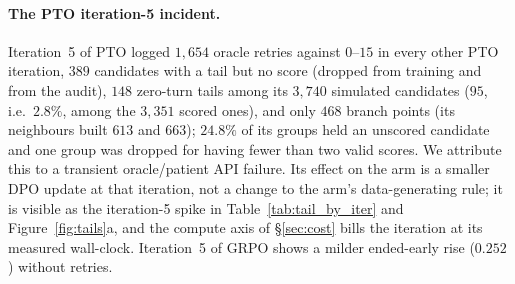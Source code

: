 \paragraph{The PTO \Kf{} iteration-5 incident.} Iteration~5 of PTO \Kf{} logged $1{,}654$
oracle retries against $0$--$15$ in every other PTO iteration, $389$ candidates with a tail
but no score (dropped from training and from the audit), $148$ zero-turn tails among its
$3{,}740$ simulated candidates ($95$, i.e.\ $2.8\%$, among the $3{,}351$ scored ones), and only
$468$ branch points (its neighbours built $613$ and $663$); $24.8\%$ of its groups
held an unscored candidate and one group was dropped for having fewer than two valid
scores. We attribute this to a transient oracle/patient API failure. Its effect on the arm
is a smaller DPO update at that iteration, not a change to the arm's data-generating rule;
it is visible as the iteration-5 spike in Table~\ref{tab:tail_by_iter} and
Figure~\ref{fig:tails}a, and the compute axis of \S\ref{sec:cost} bills the iteration at
its measured wall-clock. Iteration~5 of GRPO \Kf{} shows a milder ended-early rise ($0.252$)
without retries.

